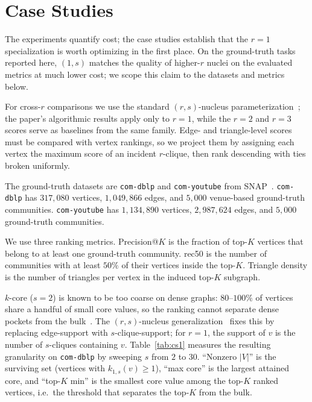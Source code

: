 \section{Case Studies}\label{sec:casestudy}

The experiments quantify cost; the case studies establish that the $r{=}1$ specialization is worth optimizing in the first place.
%
On the ground-truth tasks reported here, $(1,s)$ matches the quality of higher-$r$ nuclei on the evaluated metrics at much lower cost; we scope this claim to the datasets and metrics below.

\label{sec:cs-setup}
For cross-$r$ comparisons we use the standard $(r,s)$-nucleus parameterization~\cite{nucleusSariyuce14}; the paper's algorithmic results apply only to $r{=}1$, while the $r{=}2$ and $r{=}3$ scores serve as baselines from the same family.
%
Edge- and triangle-level scores must be compared with vertex rankings, so we project them by assigning each vertex the maximum score of an incident $r$-clique, then rank descending with ties broken uniformly.

The ground-truth datasets are \texttt{com-dblp} and \texttt{com-youtube} from SNAP~\cite{communityFinder}.
%
\texttt{com-dblp} has $317{,}080$ vertices, $1{,}049{,}866$ edges, and $5{,}000$ venue-based ground-truth communities.
%
\texttt{com-youtube} has $1{,}134{,}890$ vertices, $2{,}987{,}624$ edges, and $5{,}000$ ground-truth communities.

We use three ranking metrics.
%
Precision@$K$ is the fraction of top-$K$ vertices that belong to at least one ground-truth community.
%
rec50 is the number of communities with at least $50\%$ of their vertices inside the top-$K$.
%
Triangle density is the number of triangles per vertex in the induced top-$K$ subgraph.

\label{sec:cs-granularity}
$k$-core ($s\!=\!2$) is known to be too coarse on dense graphs: $80$--$100\%$ of vertices share a handful of small core values, so the ranking cannot separate dense pockets from the bulk~\cite{nucleusSariyuce14,nuclearTWEB}.
%
The $(r,s)$-nucleus generalization~\cite{nucleusSariyuce14} fixes this by replacing edge-support with $s$-clique-support; for $r{=}1$, the support of $v$ is the number of $s$-cliques containing $v$.
%
Table~\ref{tab:cs1} measures the resulting granularity on \texttt{com-dblp} by sweeping $s$ from $2$ to $30$.
%
``Nonzero $|V|$'' is the surviving set (vertices with $k_{1,s}(v)\!\ge\!1$), ``max core'' is the largest attained core, and ``top-$K$ min'' is the smallest core value among the top-$K$ ranked vertices, i.e.\ the threshold that separates the top-$K$ from the bulk.


